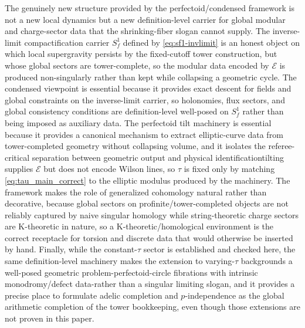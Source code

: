 \documentclass[11pt]{article}
\theoremstyle{remark}
\newcommand{\calE}{\mathcal{E}}
\begin{document}
The genuinely new structure provided by the perfectoid/condensed framework is not a new local dynamics but a new definition-level carrier for global modular and charge-sector data that the shrinking-fiber slogan cannot supply. The inverse-limit compactification carrier \(S_f^{1}\) defined by \eqref{eq:sf1-invlimit} is an honest object on which local supergravity persists by the fixed-cutoff tower construction, but whose global sectors are tower-complete, so the modular data encoded by \(\calE\) is produced non-singularly rather than kept while collapsing a geometric cycle. The condensed viewpoint is essential because it provides exact descent for fields and global constraints on the inverse-limit carrier, so holonomies, flux sectors, and global consistency conditions are definition-level well-posed on \(S_f^{1}\) rather than being imposed as auxiliary data. The perfectoid tilt machinery is essential because it provides a canonical mechanism to extract elliptic-curve data from tower-completed geometry without collapsing volume, and it isolates the referee-critical separation between geometric output and physical identification\:tilting supplies \(\calE\) but does not encode Wilson lines, so \(\tau\) is fixed only by matching \eqref{eq:tau_main_correct} to the elliptic modulus produced by the machinery. The framework makes the role of generalized cohomology natural rather than decorative, because global sectors on profinite/tower-completed objects are not reliably captured by naive singular homology while string-theoretic charge sectors are K-theoretic in nature, so a K-theoretic/homological environment is the correct receptacle for torsion and discrete data that would otherwise be inserted by hand. Finally, while the constant-\(\tau\) sector is established and checked here, the same definition-level machinery makes the extension to varying-\(\tau\) backgrounds a well-posed geometric problem-perfectoid-circle fibrations with intrinsic monodromy/defect data-rather than a singular limiting slogan, and it provides a precise place to formulate adelic completion and \(p\)-independence as the global arithmetic completion of the tower bookkeeping, even though those extensions are not proven in this paper.
\end{document}

